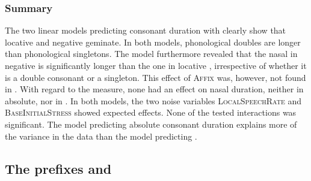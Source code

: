 \subsubsection{Summary}


The two linear models predicting consonant duration with  clearly show that locative and negative  geminate. In both models, phonological doubles are longer than phonological singletons. 
The  model furthermore revealed that the nasal in negative  is significantly longer than the one in locative , irrespective of whether it is a double consonant or a singleton. This effect of \textsc{Affix} was, however, not found in .
With regard to the  measure, none had an effect on nasal duration, neither in absolute, nor in . 
In both models, the two noise variables \textsc{LocalSpeechRate} and \textsc{BaseInitialStress} showed expected effects. None of the tested interactions was significant. 
The model predicting absolute consonant duration explains more of the variance in the data than the model predicting . 



\subsection{The prefixes  and } \label{corpus un in}


